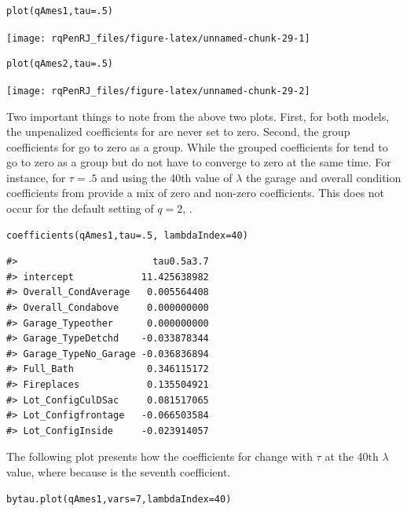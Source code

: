 \begin{verbatim}
plot(qAmes1,tau=.5)
\end{verbatim}

\begin{center}\texttt{[image: rqPenRJ\_files/figure-latex/unnamed-chunk-29-1]} \end{center}

\begin{verbatim}
plot(qAmes2,tau=.5)
\end{verbatim}

\begin{center}\texttt{[image: rqPenRJ\_files/figure-latex/unnamed-chunk-29-2]} \end{center}

Two important things to note from the above two plots. First, for both models, the unpenalized coefficients for  are never set to zero. Second, the group coefficients for  go to zero as a group. While the grouped coefficients for  tend to go to zero as a group but do not have to converge to zero at the same time. For instance, for \(\tau=.5\) and using the 40th value of \(\lambda\) the garage and overall condition coefficients from  provide a mix of zero and non-zero coefficients. This does not occur for the default setting of \(q=2\), .

\begin{verbatim}
coefficients(qAmes1,tau=.5, lambdaIndex=40)
\end{verbatim}

\begin{verbatim}
#>                        tau0.5a3.7
#> intercept            11.425638982
#> Overall_CondAverage   0.005564408
#> Overall_Condabove     0.000000000
#> Garage_Typeother      0.000000000
#> Garage_TypeDetchd    -0.033878344
#> Garage_TypeNo_Garage -0.036836894
#> Full_Bath             0.346115172
#> Fireplaces            0.135504921
#> Lot_ConfigCulDSac     0.081517065
#> Lot_Configfrontage   -0.066503584
#> Lot_ConfigInside     -0.023914057
\end{verbatim}

The following plot presents how the coefficients for  change with \(\tau\) at the 40th \(\lambda\) value, where  because  is the seventh coefficient.

\begin{verbatim}
bytau.plot(qAmes1,vars=7,lambdaIndex=40)
\end{verbatim}

